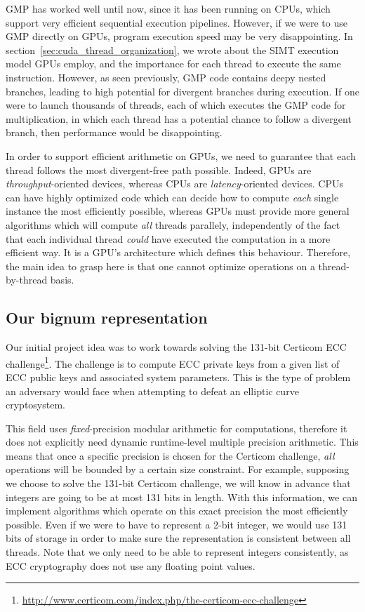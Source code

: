 \documentclass[12pt, a4paper]{report}
\begin{document}
GMP has worked well until now, since it has been running on CPUs, which support
very efficient sequential execution pipelines.
However, if we were to use GMP directly on GPUs, program execution speed may be
very disappointing.
In section~\ref{sec:cuda_thread_organization}, we wrote about the SIMT execution
model GPUs employ, and the importance for each thread to execute the same
instruction.
However, as seen previously, GMP code contains deepy nested branches, leading to
high potential for divergent branches during execution.
If one were to launch thousands of threads, each of which executes the GMP code
for multiplication, in which each thread has a potential chance to follow a
divergent branch, then performance would be disappointing.

In order to support efficient arithmetic on GPUs, we need to guarantee that each
thread follows the most divergent-free path possible.
Indeed, GPUs are \emph{throughput}-oriented devices, whereas CPUs are
\emph{latency}-oriented devices.
CPUs can have highly optimized code which can decide how to compute \emph{each}
single instance the most efficiently possible, whereas GPUs must provide more
general algorithms which will compute \emph{all} threads parallely,
independently of the fact that each individual thread \emph{could} have executed
the computation in a more efficient way.
It is a GPU's architecture which defines this behaviour.
Therefore, the main idea to grasp here is that one cannot optimize operations on
a thread-by-thread basis.

\subsection{Our bignum representation}
Our initial project idea was to work towards solving the 131-bit Certicom ECC
challenge\footnote{\url{http://www.certicom.com/index.php/the-certicom-ecc-challenge}}.
The challenge is to compute ECC private keys from a given list of ECC public
keys and associated system parameters. This is the type of problem an adversary
would face when attempting to defeat an elliptic curve cryptosystem.

This field uses \emph{fixed}-precision modular arithmetic for computations,
therefore it does not explicitly need dynamic runtime-level multiple precision
arithmetic.
This means that once a specific precision is chosen for the Certicom challenge,
\emph{all} operations will be bounded by a certain size constraint.
For example, supposing we choose to solve the 131-bit Certicom challenge, we
will know in advance that integers are going to be at most 131 bits in length.
With this information, we can implement algorithms which operate on this exact
precision the most efficiently possible.
Even if we were to have to represent a 2-bit integer, we would use 131 bits of
storage in order to make sure the representation is consistent between all
threads.
Note that we only need to be able to represent integers consistently, as
ECC cryptography does not use any floating point values.
\end{document}

